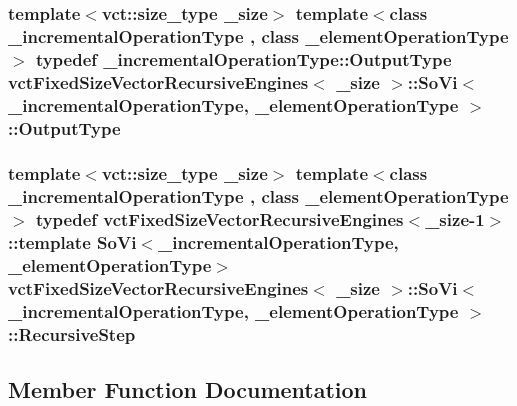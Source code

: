 \subsubsection[{Output\+Type}]{\setlength{\rightskip}{0pt plus 5cm}template$<$vct\+::size\+\_\+type \+\_\+size$>$ template$<$class \+\_\+incremental\+Operation\+Type , class \+\_\+element\+Operation\+Type $>$ typedef \+\_\+incremental\+Operation\+Type\+::\+Output\+Type {\bf vct\+Fixed\+Size\+Vector\+Recursive\+Engines}$<$ \+\_\+size $>$\+::{\bf So\+Vi}$<$ \+\_\+incremental\+Operation\+Type, \+\_\+element\+Operation\+Type $>$\+::{\bf Output\+Type}}\label{classvct_fixed_size_vector_recursive_engines_1_1_so_vi_ae988d4e7479fa6cd314b1103f6a9aeab}
\hypertarget{classvct_fixed_size_vector_recursive_engines_1_1_so_vi_aad1f6b97a64a704bf2d21d95fb834c9b}{}
\subsubsection[{Recursive\+Step}]{\setlength{\rightskip}{0pt plus 5cm}template$<$vct\+::size\+\_\+type \+\_\+size$>$ template$<$class \+\_\+incremental\+Operation\+Type , class \+\_\+element\+Operation\+Type $>$ typedef {\bf vct\+Fixed\+Size\+Vector\+Recursive\+Engines}$<$\+\_\+size-\/1$>$\+::template {\bf So\+Vi}$<$\+\_\+incremental\+Operation\+Type, \+\_\+element\+Operation\+Type$>$ {\bf vct\+Fixed\+Size\+Vector\+Recursive\+Engines}$<$ \+\_\+size $>$\+::{\bf So\+Vi}$<$ \+\_\+incremental\+Operation\+Type, \+\_\+element\+Operation\+Type $>$\+::{\bf Recursive\+Step}}\label{classvct_fixed_size_vector_recursive_engines_1_1_so_vi_aad1f6b97a64a704bf2d21d95fb834c9b}


\subsection{Member Function Documentation}
\hypertarget{classvct_fixed_size_vector_recursive_engines_1_1_so_vi_a6dad9d6ad0d8265170c4a6e0eb5f7982}{}
